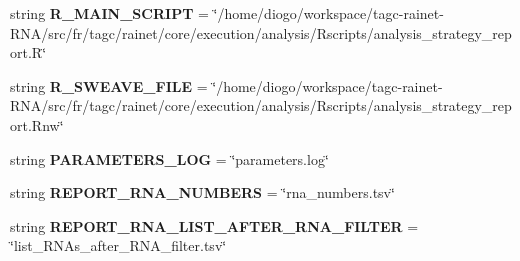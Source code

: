 \begin{DoxyCompactItemize}
\item 
\hypertarget{classsrc_1_1fr_1_1tagc_1_1rainet_1_1core_1_1execution_1_1AnalysisStrategy_1_1AnalysisStrategy_aee9e4e19e7aaa820a99b553292ec53a9}{string {\bfseries R\-\_\-\-M\-A\-I\-N\-\_\-\-S\-C\-R\-I\-P\-T} = \char`\"{}/home/diogo/workspace/tagc-\/rainet-\/R\-N\-A/src/fr/tagc/rainet/core/execution/analysis/Rscripts/analysis\-\_\-strategy\-\_\-report.\-R\char`\"{}}\label{classsrc_1_1fr_1_1tagc_1_1rainet_1_1core_1_1execution_1_1AnalysisStrategy_1_1AnalysisStrategy_aee9e4e19e7aaa820a99b553292ec53a9}

\item 
\hypertarget{classsrc_1_1fr_1_1tagc_1_1rainet_1_1core_1_1execution_1_1AnalysisStrategy_1_1AnalysisStrategy_a02454a0f78fd3fa370ddc31369f3468e}{string {\bfseries R\-\_\-\-S\-W\-E\-A\-V\-E\-\_\-\-F\-I\-L\-E} = \char`\"{}/home/diogo/workspace/tagc-\/rainet-\/R\-N\-A/src/fr/tagc/rainet/core/execution/analysis/Rscripts/analysis\-\_\-strategy\-\_\-report.\-Rnw\char`\"{}}\label{classsrc_1_1fr_1_1tagc_1_1rainet_1_1core_1_1execution_1_1AnalysisStrategy_1_1AnalysisStrategy_a02454a0f78fd3fa370ddc31369f3468e}

\item 
\hypertarget{classsrc_1_1fr_1_1tagc_1_1rainet_1_1core_1_1execution_1_1AnalysisStrategy_1_1AnalysisStrategy_a2cdd064a0f2e10ddc315085bdff7af78}{string {\bfseries P\-A\-R\-A\-M\-E\-T\-E\-R\-S\-\_\-\-L\-O\-G} = \char`\"{}parameters.\-log\char`\"{}}\label{classsrc_1_1fr_1_1tagc_1_1rainet_1_1core_1_1execution_1_1AnalysisStrategy_1_1AnalysisStrategy_a2cdd064a0f2e10ddc315085bdff7af78}

\item 
\hypertarget{classsrc_1_1fr_1_1tagc_1_1rainet_1_1core_1_1execution_1_1AnalysisStrategy_1_1AnalysisStrategy_abd70bcf568587fbe767deb268ad3049b}{string {\bfseries R\-E\-P\-O\-R\-T\-\_\-\-R\-N\-A\-\_\-\-N\-U\-M\-B\-E\-R\-S} = \char`\"{}rna\-\_\-numbers.\-tsv\char`\"{}}\label{classsrc_1_1fr_1_1tagc_1_1rainet_1_1core_1_1execution_1_1AnalysisStrategy_1_1AnalysisStrategy_abd70bcf568587fbe767deb268ad3049b}

\item 
\hypertarget{classsrc_1_1fr_1_1tagc_1_1rainet_1_1core_1_1execution_1_1AnalysisStrategy_1_1AnalysisStrategy_a59dc2f8719c4b499f987b138b0e512cf}{string {\bfseries R\-E\-P\-O\-R\-T\-\_\-\-R\-N\-A\-\_\-\-L\-I\-S\-T\-\_\-\-A\-F\-T\-E\-R\-\_\-\-R\-N\-A\-\_\-\-F\-I\-L\-T\-E\-R} = \char`\"{}list\-\_\-\-R\-N\-As\-\_\-after\-\_\-\-R\-N\-A\-\_\-filter.\-tsv\char`\"{}}\label{classsrc_1_1fr_1_1tagc_1_1rainet_1_1core_1_1execution_1_1AnalysisStrategy_1_1AnalysisStrategy_a59dc2f8719c4b499f987b138b0e512cf}


\end{DoxyCompactItemize}
